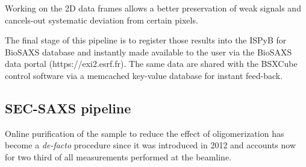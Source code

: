 \documentclass[preprint]{iucr}              %
\begin{document}
Working on the 2D data frames allows a better preservation of weak signals and cancels-out systematic deviation from certain pixels.


The final stage of this pipeline is to register those results into the ISPyB for BioSAXS \cite{ISPYBB} database and instantly made available to the user via the BioSAXS data portal (https://exi2.esrf.fr). 
The same data are shared with the BSXCube control software via a memcached key-value database for instant feed-back.

\subsection{SEC-SAXS pipeline}
Online purification of the sample to reduce the effect of oligomerization has become a \textit{de-facto} procedure
since it was introduced in 2012 \cite{SECPaper2012} and accounts now for two third of all measurements performed at the beamline.
\end{document}
